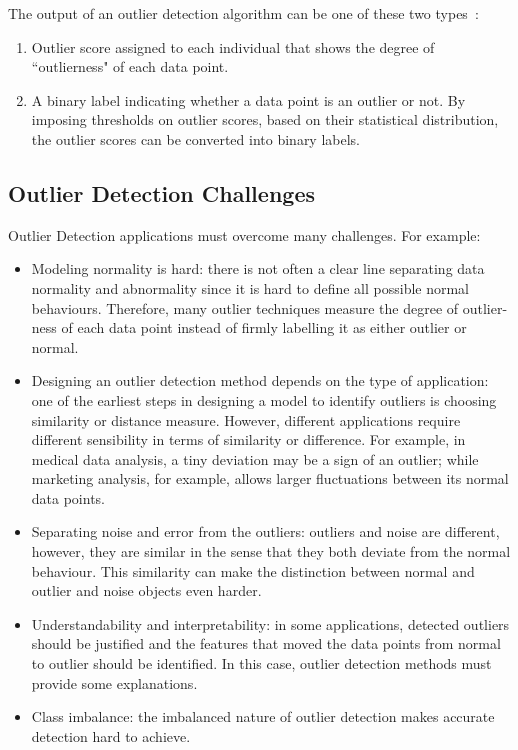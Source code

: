 The output of an outlier detection algorithm can be one of these two types~\cite{aggarwal2013}: 
\begin{enumerate}
	\item Outlier score assigned to each individual that shows the degree of ``outlierness" of each data point.
	\item A binary label indicating whether a data point is an outlier or not. By imposing thresholds on outlier scores, based on their statistical distribution, the outlier scores can be converted into binary labels.
\end{enumerate}
\subsection{Outlier Detection Challenges}
Outlier Detection applications must overcome many challenges. For example: 
\begin{itemize}
	\item Modeling normality is hard:
	there is not often a clear line separating data normality and abnormality since it is hard to define all possible normal behaviours. Therefore, many outlier techniques measure the degree of outlier-ness of each data point instead of firmly labelling it as either outlier or normal.
	\item Designing an outlier detection method depends on the type of application: one of the earliest steps in designing a model to identify outliers is choosing similarity or distance measure. However, different applications require different sensibility in terms of similarity or difference. For example, in medical data analysis, a tiny deviation may be a sign of an outlier; while marketing analysis, for example, allows larger fluctuations between its normal data points.
	\item Separating noise and error from the outliers: outliers and noise are different, however, they are similar in the sense that they both deviate from the normal behaviour. This similarity can make the distinction between normal and outlier and noise objects even harder.
	\item Understandability and interpretability: in some applications, detected outliers should be justified and the features that moved the data points from normal to outlier should be identified. In this case, outlier detection methods must provide some explanations. 
	\item Class imbalance: the imbalanced nature of outlier detection makes accurate detection hard to achieve.

\end{itemize}


